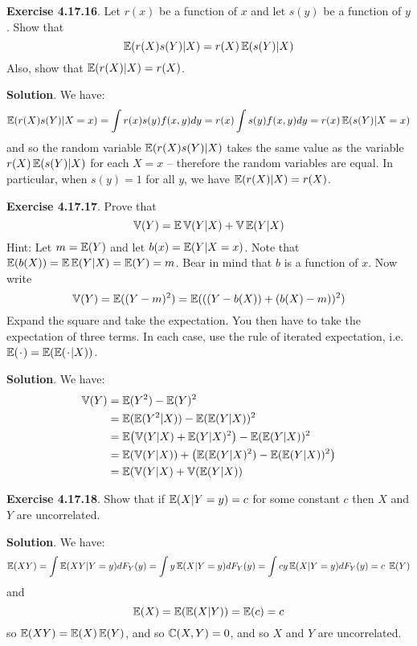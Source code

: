 \textbf{Exercise 4.17.16}. Let \(r(x)\) be a function of \(x\) and let
\(s(y)\) be a function of \(y\). Show that
\[
\operatorname{\mathbb{E}}(r(X) s(Y) | X) = r(X) \operatorname{\mathbb{E}}(s(Y) | X)
\]
Also, show that \(\operatorname{\mathbb{E}}(r(X) | X) = r(X)\).

\textbf{Solution}. We have:
\[
\operatorname{\mathbb{E}}(r(X) s(Y) | X = x) = \int r(x) s(y) f(x, y) dy = r(x) \int s(y) f(x, y) dy = r(x) \operatorname{\mathbb{E}}(s(Y) | X = x)
\]
and so the random variable \(\operatorname{\mathbb{E}}(r(X) s(Y) | X)\) takes the same
value as the variable \(r(X) \operatorname{\mathbb{E}}(s(Y) | X)\) for each \(X = x\)
-- therefore the random variables are equal.
In particular, when \(s(y) = 1\) for all \(y\), we have
\(\operatorname{\mathbb{E}}(r(X) | X) = r(X)\).

\textbf{Exercise 4.17.17}. Prove that
\[
\operatorname{\mathbb{V}}(Y) = \operatorname{\mathbb{E}} \operatorname{\mathbb{V}} (Y | X) + \operatorname{\mathbb{V}} \operatorname{\mathbb{E}} (Y | X)
\]
Hint: Let \(m = \operatorname{\mathbb{E}}(Y)\) and let
\(b(x) = \operatorname{\mathbb{E}}(Y | X = x)\). Note that
\(\operatorname{\mathbb{E}}(b(X)) = \operatorname{\mathbb{E}} \operatorname{\mathbb{E}}(Y | X) = \operatorname{\mathbb{E}}(Y) = m\).
Bear in mind that \(b\) is a function of \(x\). Now write
\[
\operatorname{\mathbb{V}}(Y) = \operatorname{\mathbb{E}}((Y - m)^{2}) = \operatorname{\mathbb{E}}(((Y - b(X)) + (b(X) - m))^{2})
\]
Expand the square and take the expectation. You then have to take the
expectation of three terms. In each case, use the rule of iterated
expectation,
i.e.~\(\EXP(\placeholder) = \EXP(\EXP(\placeholder | X))\).

\textbf{Solution}. We have:
\begin{align*}
\VAR(Y) &= \EXP(Y^{2}) - \EXP(Y)^{2} \\
&= \EXP(\EXP(Y^{2} | X)) - \EXP(\EXP(Y | X))^{2} \\
&= \EXP\left( \VAR(Y | X) + \EXP(Y | X)^{2} \right) - \EXP(\EXP(Y | X))^{2} \\
&= \EXP(\VAR(Y | X)) + \left( \EXP(\EXP(Y | X)^{2}) - \EXP(\EXP(Y | X))^{2} \right) \\
&= \EXP (\VAR(Y | X) + \VAR(\EXP(Y | X))
\end{align*}

\textbf{Exercise 4.17.18}. Show that if $\operatorname{\mathbb{E}}(X | Y = y)
= c $ for some constant \(c\) then \(X\) and \(Y\) are uncorrelated.

\textbf{Solution}. We have:
\[
\operatorname{\mathbb{E}}(XY) = \int \operatorname{\mathbb{E}}(XY | Y = y) dF_Y(y) = \int y \operatorname{\mathbb{E}}(X | Y = y) dF_Y(y) = \int cy \operatorname{\mathbb{E}}(X | Y = y) dF_Y(y) = c \; \operatorname{\mathbb{E}}(Y)
\]
and
\[
\operatorname{\mathbb{E}}(X) = \operatorname{\mathbb{E}}(\operatorname{\mathbb{E}}(X | Y)) = \operatorname{\mathbb{E}}(c) = c
\]
so \(\operatorname{\mathbb{E}}(XY) = \operatorname{\mathbb{E}}(X) \operatorname{\mathbb{E}}(Y)\), and so
\(\operatorname{\mathbb{C}}(X, Y) = 0\), and so \(X\) and \(Y\) are uncorrelated.

